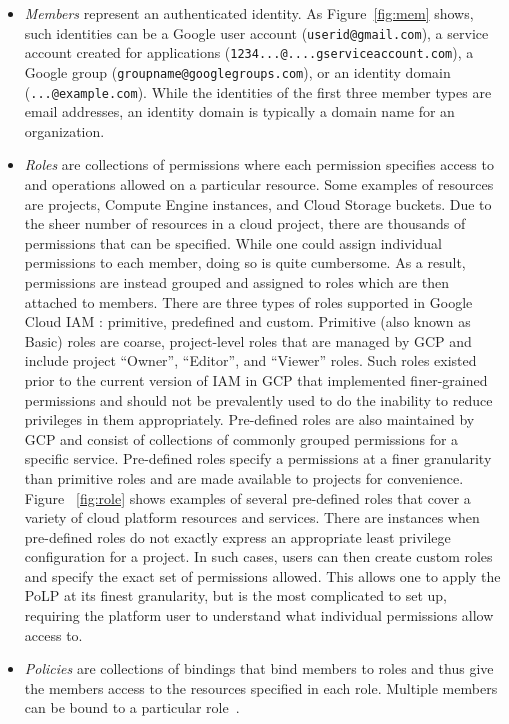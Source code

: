 \begin{itemize}
\item {\em Members} represent an authenticated identity.  As Figure~\ref{fig:mem} shows, such identities can be a Google user account
({\tt userid@gmail.com}), a service account created for applications ({\tt 1234...@....gserviceaccount.com}), a Google group ({\tt groupname@googlegroups.com}), or an identity domain ({\tt ...@example.com}). While the identities of the first three member types are email 
addresses, an identity domain is typically a domain name for an organization.

\item {\em Roles} are collections of permissions where each permission specifies access to and operations allowed on a particular resource.
Some examples of resources are projects, Compute Engine instances, and Cloud Storage buckets.  Due to the sheer number of 
resources in a cloud project, there are thousands of permissions that can be specified.  While one could assign individual
permissions to each member, doing so is quite cumbersome.  As a result, permissions are instead grouped and assigned to roles which are
then attached to members.  There are three types of roles supported in Google Cloud IAM \cite{googlecloudrole}: primitive, predefined and custom.
Primitive (also known as Basic) roles are coarse, project-level roles that are managed by GCP and include project ``Owner'', ``Editor'', and 
``Viewer'' roles.  Such roles existed prior to the current version of IAM in GCP that implemented finer-grained permissions and should not
be prevalently used to do the inability to reduce privileges in them appropriately.  Pre-defined roles are also maintained by GCP and
consist of collections of commonly grouped permissions for a specific service.  Pre-defined roles specify a permissions at a finer granularity 
than primitive roles and are made available to projects for convenience.  Figure ~\ref{fig:role} shows examples of several pre-defined roles that cover a variety of cloud platform resources and services.  There are instances when pre-defined roles do not exactly express an appropriate least privilege configuration for
a project.  In such cases, users can then create custom roles and specify the exact set of permissions
allowed.  This allows one to apply the PoLP at its finest granularity, but is the most complicated to set up, requiring the platform user to understand what individual permissions allow access to.

\item {\em Policies} are collections of bindings that bind members to roles and thus give the members access to the resources specified in
each role.  Multiple members can be bound to a particular role~\cite{Googlecloudiam}. 
\end{itemize}

